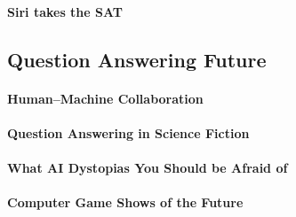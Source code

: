 \documentclass[bfivepaper,twosided,justified,nobib]{style/tufte-book}
\newif\ifproposal\proposaltrue
\newcommand{\proposalpart}[1]{
  \ifproposal
  \subsection{#1}
  \else
  \part{#1}
  \fi
}
\newcommand{\chapterfile}[3]{
  \ifproposal
  \paragraph{#3}
  
  \else
  \chapter{#3}
  \label{ch:#1}
  \begin{quote}
    
  \end{quote}
  
  \fi}
\begin{document}
\chapterfile{280}{leaderboards}{Siri takes the SAT}







\proposalpart{Question Answering Future}

\chapterfile{300}{datasets_adversarial}{Human--Machine Collaboration}

\chapterfile{310}{sci_fi}{Question Answering in Science Fiction}

\chapterfile{330}{fear_of_a_bot_planet}{What AI Dystopias You Should
  be Afraid of}




\chapterfile{340}{game_show}{Computer Game Shows of the Future}


\fi




\backmatter





\printindex
\end{document}
